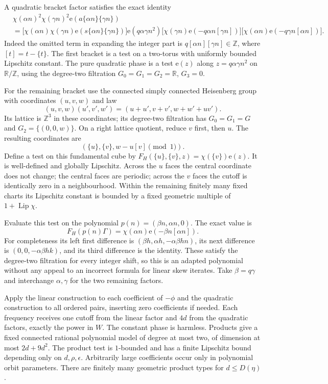 \documentclass[11pt]{article}
\newcommand{\R}{\mathbb R}\newcommand{\Z}{\mathbb Z}
\newcommand{\ee}{\mathrm e}
\begin{document}
A quadratic bracket factor satisfies the exact identity
\begin{align*}
 &\chi(\alpha n)^2\chi(\gamma n)^2
                    \ee(a\{\alpha n\}\{\gamma n\})\\
 &=\bigl[\chi(\alpha n)\chi(\gamma n)
             \ee(s\{\alpha n\}\{\gamma n\})\bigr]
   \ee(q\alpha\gamma n^2)
   \bigl[\chi(\gamma n)\ee(-q\alpha n[\gamma n])\bigr]
   \bigl[\chi(\alpha n)\ee(-q\gamma n[\alpha n])\bigr].
\end{align*}
Indeed the omitted term in expanding the integer part is
$q[\alpha n][\gamma n]\in\Z$, where $[t]=t-\{t\}$.
The first bracket is a test on a two-torus with uniformly bounded
Lipschitz constant. The pure quadratic phase is a test $\ee(z)$
along $z=q\alpha\gamma n^2$ on $\R/\Z$, using the degree-two
filtration $G_0=G_1=G_2=\R$, $G_3=0$.

For the remaining bracket use the connected simply connected Heisenberg
group with coordinates $(u,v,w)$ and law
\[
 (u,v,w)(u',v',w')=(u+u',v+v',w+w'+uv').
\]
Its lattice is $\Z^3$ in these coordinates; its degree-two filtration
has $G_0=G_1=G$ and $G_2=\{(0,0,w)\}$.
On a right lattice quotient, reduce $v$ first, then $u$. The resulting
coordinates are
\[
 (\{u\},\{v\},w-u[v]\pmod1).
\]
Define a test on this fundamental cube by
$F_H(\{u\},\{v\},z)=\chi(\{v\})\ee(z)$.
It is well-defined and globally Lipschitz. Across the $u$ faces the
central coordinate does not change; the central faces are periodic;
across the $v$ faces the cutoff is identically zero in a neighbourhood.
Within the remaining finitely many fixed charts its Lipschitz constant
is bounded by a fixed geometric multiple of
$1+\operatorname{Lip}\chi$.

Evaluate this test on the polynomial
$p(n)=(\beta n,\alpha n,0)$. The exact value is
\[
 F_H(p(n)\Gamma)=\chi(\alpha n)\ee(-\beta n[\alpha n]).
\]
For completeness its left first difference is
$(\beta h,\alpha h,-\alpha\beta hn)$, its next difference
is $(0,0,-\alpha\beta hk)$, and its third difference is the
identity. These satisfy the degree-two filtration for every integer
shift, so this is an adapted polynomial without any appeal to an
incorrect formula for linear skew iterates. Take $\beta=q\gamma$
and interchange $\alpha,\gamma$ for the two remaining factors.

Apply the linear construction to each coefficient of $-\phi$ and
the quadratic construction to all ordered pairs, inserting zero
coefficients if needed. Each frequency receives one cutoff from the
linear factor and $4d$ from the quadratic factors, exactly the power
in $W$. The constant phase is harmless. Products give a fixed
connected rational polynomial model of degree at most two, of dimension
at most $2d+9d^2$. The product test is $1$-bounded and has a finite
Lipschitz bound depending only on $d,\rho,\epsilon$. Arbitrarily
large coefficients occur only in polynomial orbit parameters.
There are finitely many geometric product types for $d\leq D(\eta)$.
\end{document}
